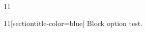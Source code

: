 \documentclass[paper=A4]{ropas-poster}
\begin{document}
\begin{postergrid}{1}{1}
\begin{posterblock}{1}{1}[sectiontitle-color=blue]
Block option test.
\end{posterblock}
\end{postergrid}
\end{document}
